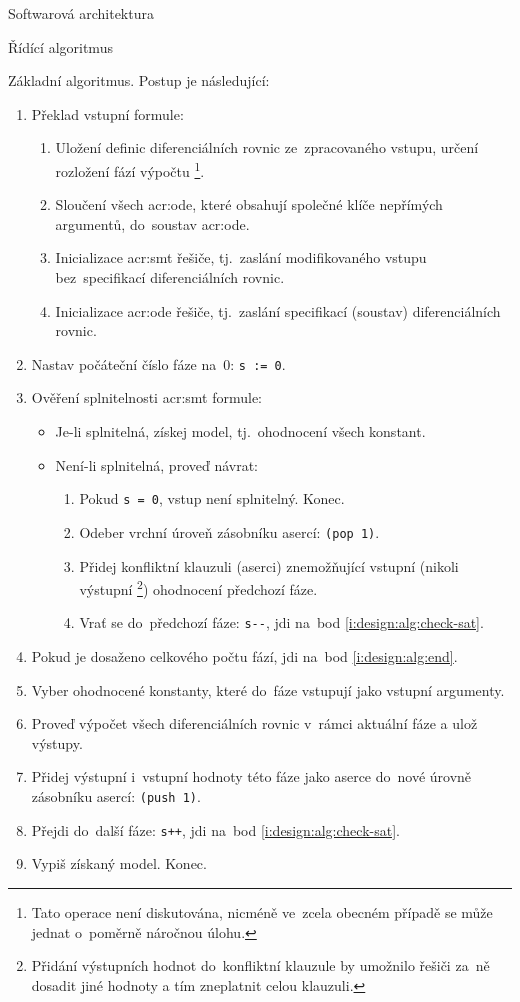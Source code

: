 \documentclass[thesis=M,czech]{FITthesis}[2012/06/26]
\newcommand{\acrlabel}[1]{acr:#1}
\newcommand{\acr}[1]{\acrshort{\acrlabel{#1}}}
\newcommand{\id}[1]{\texttt{#1}}
\newcommand{\rf}[1]{\ref{#1}}
\begin{document}
\begin{section}{Softwarová architektura}
\begin{subsection}{Řídící algoritmus}
\begin{paragraph}{Základní algoritmus.}
Postup je následující:
\begin{enumerate}
\item Překlad vstupní formule:
   \begin{enumerate}
   \item Uložení definic diferenciálních rovnic
      ze~zpracovaného vstupu, určení rozložení fází výpočtu%
      \footnote{Tato operace není diskutována,
      nicméně ve~zcela obecném případě se může jednat
      o~poměrně náročnou úlohu.}.
   \item Sloučení všech \acr{ode}, které obsahují
      společné klíče nepřímých argumentů,
      do~soustav \acr{ode}.
   \item Inicializace \acr{smt} řešiče,
      tj.~zaslání modifikovaného vstupu
      bez~specifikací diferenciálních rovnic.
   \item Inicializace \acr{ode} řešiče,
      tj.~zaslání specifikací (soustav) diferenciálních rovnic.
   \end{enumerate}
\item Nastav počáteční číslo fáze na~$0$: \id{s~:= 0}.
\item \label{i:design:alg:check-sat}
   Ověření splnitelnosti \acr{smt} formule:
   \begin{itemize}
   \item Je-li splnitelná, získej model,
      tj.~ohodnocení všech konstant.
   \item Není-li splnitelná, proveď návrat:
      \begin{enumerate}
      \item Pokud \id{s = 0}, vstup není splnitelný. Konec.
      \item Odeber vrchní úroveň zásobníku asercí: \id{(pop~1)}.
      \item Přidej konfliktní klauzuli (aserci)
         znemožňující vstupní (nikoli výstupní%
         \footnote{Přidání výstupních hodnot do~konfliktní
         klauzule by umožnilo řešiči za~ně dosadit jiné hodnoty
         a tím zneplatnit celou klauzuli.})
         ohodnocení předchozí fáze.
      \item Vrať se do~předchozí fáze:
         \id{s-{}-}, jdi na~bod \rf{i:design:alg:check-sat}.
      \end{enumerate}
   \end{itemize}
\item Pokud je dosaženo celkového počtu fází,
   jdi na~bod \rf{i:design:alg:end}.
\item Vyber ohodnocené konstanty,
   které do~fáze vstupují jako vstupní argumenty.
\item Proveď výpočet všech diferenciálních rovnic
   v~rámci aktuální fáze a ulož výstupy.
\item Přidej výstupní i~vstupní hodnoty této fáze
   jako aserce do~nové úrovně zásobníku asercí: \id{(push~1)}.
\item Přejdi do~další fáze: \id{s+{}+},
   jdi na~bod \rf{i:design:alg:check-sat}.
\item \label{i:design:alg:end}
   Vypiš získaný model. Konec.
\end{enumerate}


\end{paragraph}
\end{subsection}
\end{section}
\end{document}
